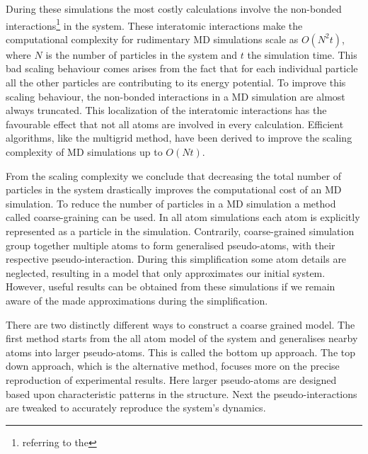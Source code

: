 During these simulations the most costly calculations involve the non-bonded
interactions\footnote{referring to the } in the system. These interatomic interactions
make the computational
complexity for rudimentary MD simulations scale as $O(N^2t)$, where $N$ is the number of
particles in the system and $t$ the simulation time. This bad scaling behaviour comes
arises from the fact that for each individual particle all the other particles are
contributing to its energy potential. To improve this scaling behaviour, the non-bonded
interactions in a MD simulation are almost always truncated. This localization of the
interatomic interactions has the favourable effect that not all atoms are involved in
every calculation. Efficient algorithms, like the multigrid method, have been derived
to improve the scaling complexity of MD simulations up to $O(Nt)$. \cite{Celeste2001}

From the scaling complexity we conclude that decreasing the total number of particles in
the system drastically improves the computational cost of an MD simulation. To reduce the
number of particles in a MD simulation a method called coarse-graining can be used.
In all atom simulations each atom is explicitly represented as a particle in the
simulation. Contrarily, coarse-grained simulation group together multiple atoms to form
generalised pseudo-atoms, with their respective pseudo-interaction. During this
simplification some atom details are neglected, resulting in a model that only
approximates our initial system. However, useful results can be obtained from
these simulations if we remain aware of the made approximations during the
simplification.


There are two distinctly different ways to construct a coarse grained model. The first
method starts from the all atom model of the system and generalises nearby atoms into
larger pseudo-atoms. This is called the bottom up approach. The top down approach, which
is the alternative method, focuses more on the precise reproduction of experimental
results. Here larger pseudo-atoms are designed based upon characteristic patterns in the
structure. Next the pseudo-interactions are tweaked to accurately reproduce the
system's dynamics.


